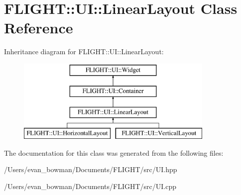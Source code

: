 \hypertarget{class_f_l_i_g_h_t_1_1_u_i_1_1_linear_layout}{}\section{F\+L\+I\+G\+HT\+:\+:UI\+:\+:Linear\+Layout Class Reference}
\label{class_f_l_i_g_h_t_1_1_u_i_1_1_linear_layout}
Inheritance diagram for F\+L\+I\+G\+HT\+:\+:UI\+:\+:Linear\+Layout\+:\begin{figure}[H]
\begin{center}
\leavevmode
\includegraphics[height=4.000000cm]{class_f_l_i_g_h_t_1_1_u_i_1_1_linear_layout}
\end{center}
\end{figure}


The documentation for this class was generated from the following files\+:\begin{DoxyCompactItemize}
\item 
/\+Users/evan\+\_\+bowman/\+Documents/\+F\+L\+I\+G\+H\+T/src/U\+I.\+hpp\item 
/\+Users/evan\+\_\+bowman/\+Documents/\+F\+L\+I\+G\+H\+T/src/U\+I.\+cpp\end{DoxyCompactItemize}
